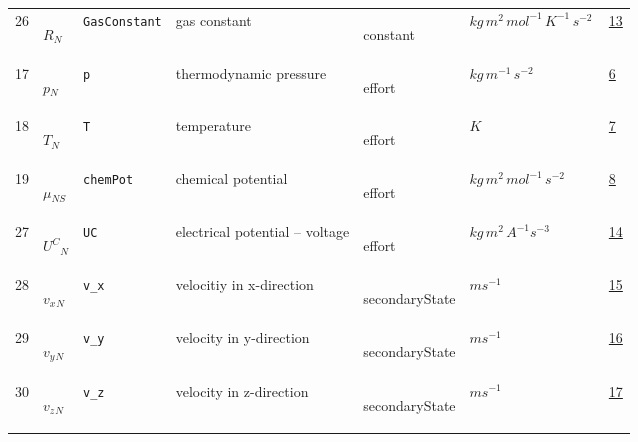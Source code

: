 \begin{longtable}{|p{1cm}|p{2.5cm}|p{4.5cm}|p{8cm}|p{3.0cm}|p{3cm}|p{1cm}|}
    26
             & \hypertarget{"v:26"}{ $ {R}{_{N}} $}
             & \verb|GasConstant|
             & gas constant
             & \begin{lay}constant \end{lay}
             & $ kg \,m^{2} \,mol^{-1} \,K^{-1} \,s^{-2} \, $
             & \hyperlink{"e:13"}{ 13 }
                 \\
    17
             & \hypertarget{"v:17"}{ $ {p}{_{N}} $}
             & \verb|p|
             & thermodynamic pressure
             & \begin{lay}effort \end{lay}
             & $ kg \,m^{-1} \,s^{-2} \, $
             & \hyperlink{"e:6"}{ 6 }
                 \\
    18
             & \hypertarget{"v:18"}{ $ {T}{_{N}} $}
             & \verb|T|
             & temperature
             & \begin{lay}effort \end{lay}
             & $ K \, $
             & \hyperlink{"e:7"}{ 7 }
                 \\
    19
             & \hypertarget{"v:19"}{ $ {\mu}{_{{N S}}} $}
             & \verb|chemPot|
             & chemical potential
             & \begin{lay}effort \end{lay}
             & $ kg \,m^{2} \,mol^{-1} \,s^{-2} \, $
             & \hyperlink{"e:8"}{ 8 }
                 \\
    27
             & \hypertarget{"v:27"}{ $ {{U^C}}{_{N}} $}
             & \verb|UC|
             & electrical potential -- voltage
             & \begin{lay}effort \end{lay}
             & $ kg \,m^{2} \,A^{-1} s^{-3} \, $
             & \hyperlink{"e:14"}{ 14 }
                 \\
    28
             & \hypertarget{"v:28"}{ $ {{v_x}}{_{N}} $}
             & \verb|v_x|
             & velocitiy in x-direction
             & \begin{lay}secondaryState \end{lay}
             & $ m s^{-1} \, $
             & \hyperlink{"e:15"}{ 15 }
                 \\
    29
             & \hypertarget{"v:29"}{ $ {{v_y}}{_{N}} $}
             & \verb|v_y|
             & velocity in y-direction
             & \begin{lay}secondaryState \end{lay}
             & $ m s^{-1} \, $
             & \hyperlink{"e:16"}{ 16 }
                 \\
    30
             & \hypertarget{"v:30"}{ $ {{v_z}}{_{N}} $}
             & \verb|v_z|
             & velocity in z-direction
             & \begin{lay}secondaryState \end{lay}
             & $ m s^{-1} \, $
             & \hyperlink{"e:17"}{ 17 }
                 \\
    \end{longtable}
